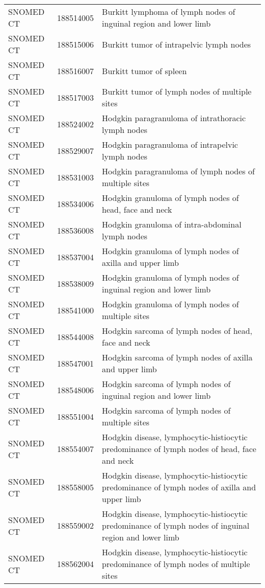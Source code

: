 \begin{longtable}{p{}p{}p{}}
  SNOMED CT & 188514005 & Burkitt lymphoma of lymph nodes of inguinal region and lower limb \\ 
  SNOMED CT & 188515006 & Burkitt tumor of intrapelvic lymph nodes \\ 
  SNOMED CT & 188516007 & Burkitt tumor of spleen \\ 
  SNOMED CT & 188517003 & Burkitt tumor of lymph nodes of multiple sites \\ 
  SNOMED CT & 188524002 & Hodgkin paragranuloma of intrathoracic lymph nodes \\ 
  SNOMED CT & 188529007 & Hodgkin paragranuloma of intrapelvic lymph nodes \\ 
  SNOMED CT & 188531003 & Hodgkin paragranuloma of lymph nodes of multiple sites \\ 
  SNOMED CT & 188534006 & Hodgkin granuloma of lymph nodes of head, face and neck \\ 
  SNOMED CT & 188536008 & Hodgkin granuloma of intra-abdominal lymph nodes \\ 
  SNOMED CT & 188537004 & Hodgkin granuloma of lymph nodes of axilla and upper limb \\ 
  SNOMED CT & 188538009 & Hodgkin granuloma of lymph nodes of inguinal region and lower limb \\ 
  SNOMED CT & 188541000 & Hodgkin granuloma of lymph nodes of multiple sites \\ 
  SNOMED CT & 188544008 & Hodgkin sarcoma of lymph nodes of head, face and neck \\ 
  SNOMED CT & 188547001 & Hodgkin sarcoma of lymph nodes of axilla and upper limb \\ 
  SNOMED CT & 188548006 & Hodgkin sarcoma of lymph nodes of inguinal region and lower limb \\ 
  SNOMED CT & 188551004 & Hodgkin sarcoma of lymph nodes of multiple sites \\ 
  SNOMED CT & 188554007 & Hodgkin disease, lymphocytic-histiocytic predominance of lymph nodes of head, face and neck \\ 
  SNOMED CT & 188558005 & Hodgkin disease, lymphocytic-histiocytic predominance of lymph nodes of axilla and upper limb \\ 
  SNOMED CT & 188559002 & Hodgkin disease, lymphocytic-histiocytic predominance of lymph nodes of inguinal region and lower limb \\ 
  SNOMED CT & 188562004 & Hodgkin disease, lymphocytic-histiocytic predominance of lymph nodes of multiple sites \\ 

\end{longtable}
